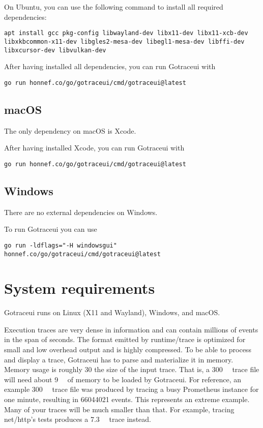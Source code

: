 \documentclass[10pt,letterpaper,oneside,openany,english]{memoir}
\newcommand{\code}[1]{{\ttfamily\mbox{#1}}}
\begin{document}
On Ubuntu, you can use the following command to install all required dependencies:

\begin{verbatim}
apt install gcc pkg-config libwayland-dev libx11-dev libx11-xcb-dev libxkbcommon-x11-dev libgles2-mesa-dev libegl1-mesa-dev libffi-dev libxcursor-dev libvulkan-dev
\end{verbatim}

After having installed all dependencies, you can run Gotraceui with

\begin{verbatim}
go run honnef.co/go/gotraceui/cmd/gotraceui@latest
\end{verbatim}

\section*{macOS}

The only dependency on macOS is Xcode.

After having installed Xcode, you can run Gotraceui with

\begin{verbatim}
go run honnef.co/go/gotraceui/cmd/gotraceui@latest
\end{verbatim}

\section*{Windows}

There are no external dependencies on Windows.

To run Gotraceui you can use

\begin{verbatim}
go run -ldflags="-H windowsgui" honnef.co/go/gotraceui/cmd/gotraceui@latest
\end{verbatim}

\chapter{System requirements}

Gotraceui runs on Linux (X11 and Wayland), Windows, and macOS.

Execution traces are very dense in information and can contain millions of events in the span of seconds.
The format emitted by \code{runtime/trace} is optimized for small and low overhead output and is highly compressed.
To be able to process and display a trace, Gotraceui has to parse and materialize it in memory.
Memory usage is roughly 30\texttimes{} the size of the input trace.
That is, a \qty{300}{\mega\byte} trace file will need about \qty{9}{\giga\byte} of memory to be loaded by Gotraceui.
For reference, an example \qty{300}{\mega\byte} trace file was produced by tracing a busy Prometheus instance for one minute,
resulting in \num{66044021} events.
This represents an extreme example.
Many of your traces will be much smaller than that.
For example, tracing \code{net/http}'s tests produces a \qty{7.3}{\mega\byte} trace instead. 
\end{document}
